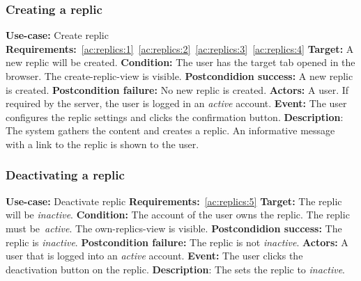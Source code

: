 \subsubsection{Creating a replic}\label{subsubsec:create-replic}
\textbf{Use-case:} Create replic \newline
\textbf{Requirements:}~\ref{ac:replics:1}~\ref{ac:replics:2}~\ref{ac:replics:3}~\ref{ac:replics:4} \newline
\textbf{Target:} A new replic will be created. \newline
\textbf{Condition:} The user has the target tab opened in the browser.
The create-replic-view is visible. \newline
\textbf{Postcondidion success:} A new replic is created. \newline
\textbf{Postcondition failure:} No new replic is created. \newline
\textbf{Actors:} A user.
If required by the server, the user is logged in an \textit{active} account. \newline
\textbf{Event:} The user configures the replic settings and clicks the confirmation button. \newline
\textbf{Description}: The system gathers the content and creates a replic.
An informative message with a link to the replic is shown to the user.

\subsubsection{Deactivating a replic}\label{subsubsec:deactivate-replic}
\textbf{Use-case:} Deactivate replic \newline
\textbf{Requirements:}~\ref{ac:replics:5} \newline
\textbf{Target:} The replic will be \textit{inactive}. \newline
\textbf{Condition:} The account of the user owns the replic.
The replic must be~\textit{active}.
The own-replics-view is visible. \newline
\textbf{Postcondidion success:} The replic is \textit{inactive}. \newline
\textbf{Postcondition failure:} The replic is not \textit{inactive}. \newline
\textbf{Actors:} A user that is logged into an \textit{active} account. \newline
\textbf{Event:} The user clicks the deactivation button on the replic. \newline
\textbf{Description}: The sets the replic to \textit{inactive}.

